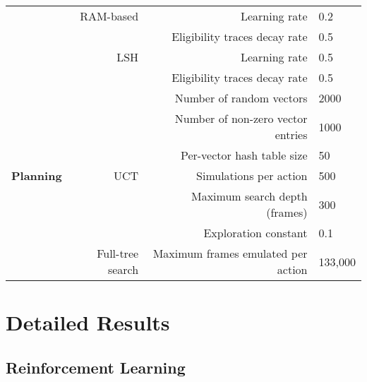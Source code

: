 \documentclass[twoside,11pt]{article}
\begin{document}
\begin{table}[h!]
\begin{center}
\begin{tabular}{|r||r||r|l|}
& RAM-based & Learning rate  & 0.2 \\
\cline{3-4}
& & Eligibility traces decay rate  & 0.5 \\
\cline{2-4}

& LSH & Learning rate  & 0.5 \\
\cline{3-4}
& & Eligibility traces decay rate  & 0.5 \\
\cline{3-4}
& & Number of random vectors  & 2000 \\
\cline{3-4}
& & Number of non-zero vector entries  & 1000 \\
\cline{3-4}
& & Per-vector hash table size  & 50 \\ 
\hline
\hline
\textbf{Planning} & UCT & Simulations per action & 500 \\
\cline{3-4}
& & Maximum search depth (frames) & 300 \\
\cline{3-4}
& & Exploration constant & 0.1 \\
\cline{2-4}
& Full-tree search & Maximum frames emulated per action & 133,000 \\
\hline
\end{tabular}
\end{center}
\end{table}

\newpage
\section{Detailed Results}\label{appendix:detailed_results}

\subsection{Reinforcement Learning}
\end{document}
